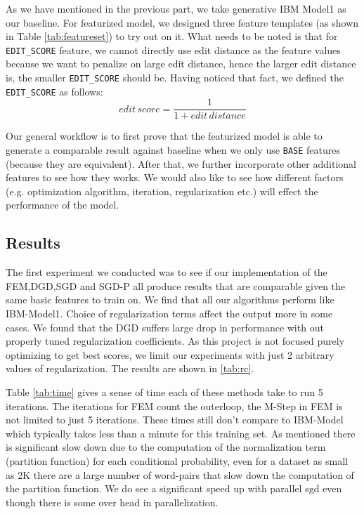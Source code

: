 \documentclass[11pt,letterpaper]{article}
\begin{document}
As we have mentioned in the previous part, we take generative IBM Model1 as our baseline.
For featurized model, we designed three feature templates (as shown in Table \ref{tab:featureset}) to try out on it.
What needs to be noted is that for \texttt{EDIT\_SCORE} feature, we cannot directly use edit distance as the feature values because we want to penalize on large edit distance, hence the larger edit distance is, the smaller \texttt{EDIT\_SCORE} should be. Having noticed that fact, we defined the \texttt{EDIT\_SCORE} as follows:
\[edit\,score = \dfrac{1}{1 + edit\,distance}\]

Our general workflow is to first prove that the featurized model is able to generate a comparable result against baseline when we only use \texttt{BASE} features (because they are equivalent).
After that, we further incorporate other additional features to see how they works.
We would also like to see how different factors (e.g. optimization algorithm, iteration, regularization etc.) will effect the performance of the model.

\subsection{Results}
The first experiment we conducted was to see if our implementation of the FEM,DGD,SGD and SGD-P all produce results that are comparable given the same basic features to train on. We find that all our algorithms perform like IBM-Model1. Choice of regularization terms affect the output more in some cases. We found that the DGD suffers large drop in performance with out properly tuned regularization coefficients. As this project is not focused purely optimizing to get best scores, we limit our experiments with just 2 arbitrary values of regularization. The results are shown in \ref{tab:rc}. 

Table \ref{tab:time} gives a sense of time each of these methods take to run 5 iterations. The iterations for FEM count the outerloop, the M-Step in FEM is not limited to just 5 iterations. These times still don't compare to IBM-Model which typically takes less than a minute for this training set. As mentioned there is significant slow down due to the computation of the normalization term (partition function) for each conditional probability, even for a dataset as small as 2K there are a large number of word-pairs that slow down the computation of the partition function. We do see a significant speed up with parallel sgd even though there is some over head in parallelization.
\end{document}
